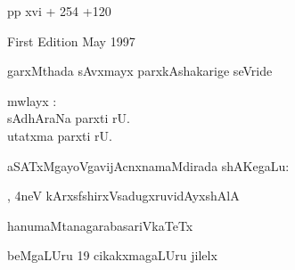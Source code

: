 \medskip
{\rm pp xvi + 254 +120}

\medskip
{\rm First Edition May 1997}

\bigskip
garxMthada sAvxmayx parxkAshakarige seVride

\bigskip
\begin{center}
{ mwlayx :}\\[15pt]
{sAdhAraNa parxti rU. }\\[15pt]
{utatxma parxti rU. }
\end{center}

\bigskip
\begin{center}
aSATxMgayoVgavijAcnxnamaMdirada shAKegaLu:
\end{center}

, 4neV kArxsf\hfill shirxVsadugxruvidAyxshAlA

hanumaMtanagara\hfill basariVkaTeTx 

beMgaLUru 19 \hfill cikakxmagaLUru jilelx
